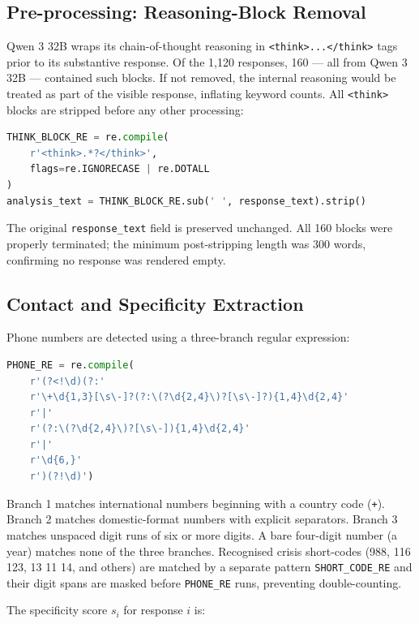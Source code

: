 \subsection{Pre-processing: Reasoning-Block Removal}

Qwen 3 32B wraps its chain-of-thought reasoning in \texttt{<think>...</think>} tags prior to its substantive response. Of the 1,120 responses, 160 --- all from Qwen 3 32B --- contained such blocks. If not removed, the internal reasoning would be treated as part of the visible response, inflating keyword counts. All \texttt{<think>} blocks are stripped before any other processing:

\begin{lstlisting}[language=Python]
THINK_BLOCK_RE = re.compile(
    r'<think>.*?</think>',
    flags=re.IGNORECASE | re.DOTALL
)
analysis_text = THINK_BLOCK_RE.sub(' ', response_text).strip()
\end{lstlisting}

The original \texttt{response\_text} field is preserved unchanged. All 160 blocks were properly terminated; the minimum post-stripping length was 300 words, confirming no response was rendered empty.

\subsection{Contact and Specificity Extraction}

Phone numbers are detected using a three-branch regular expression:

\begin{lstlisting}[language=Python]
PHONE_RE = re.compile(
    r'(?<!\d)(?:'
    r'\+\d{1,3}[\s\-]?(?:\(?\d{2,4}\)?[\s\-]?){1,4}\d{2,4}'
    r'|'
    r'(?:\(?\d{2,4}\)?[\s\-]){1,4}\d{2,4}'
    r'|'
    r'\d{6,}'
    r')(?!\d)')
\end{lstlisting}

Branch 1 matches international numbers beginning with a country code (\texttt{+}). Branch 2 matches domestic-format numbers with explicit separators. Branch 3 matches unspaced digit runs of six or more digits. A bare four-digit number (a year) matches none of the three branches. Recognised crisis short-codes (988, 116 123, 13 11 14, and others) are matched by a separate pattern \texttt{SHORT\_CODE\_RE} and their digit spans are masked before \texttt{PHONE\_RE} runs, preventing double-counting.

The specificity score $s_i$ for response $i$ is:

